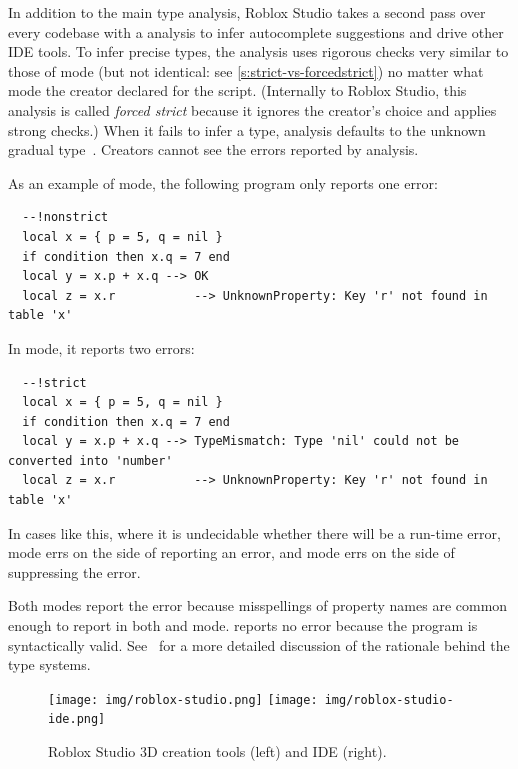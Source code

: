 \documentclass[english,submission,cleveref]{programming}
\begin{document}
In addition to the main type analysis, Roblox Studio takes a second pass over
every codebase with a \emph{\FS{}} analysis to infer autocomplete suggestions
and drive other IDE tools.
To infer precise types,
the \FS{} analysis uses rigorous checks very similar to those of
\mstrict{} mode (but not identical: see \cref{s:strict-vs-forcedstrict})
no matter what mode the creator declared for the script.
(Internally to Roblox Studio, this analysis is called \emph{forced strict}
because it ignores the creator's choice and applies strong checks.)
When it fails to infer a type, \FS{} analysis defaults to the unknown gradual
type~\cite{st-sfp-2006}.
Creators cannot see the errors reported by \FS{} analysis.

As an example of \mnonstrict{} mode, the following program only reports one error:
\begin{verbatim}
  --!nonstrict
  local x = { p = 5, q = nil }
  if condition then x.q = 7 end
  local y = x.p + x.q --> OK
  local z = x.r           --> UnknownProperty: Key 'r' not found in table 'x'
\end{verbatim}
In \mstrict{} mode, it reports two errors:
\begin{verbatim}
  --!strict
  local x = { p = 5, q = nil }
  if condition then x.q = 7 end
  local y = x.p + x.q --> TypeMismatch: Type 'nil' could not be converted into 'number'
  local z = x.r           --> UnknownProperty: Key 'r' not found in table 'x'
\end{verbatim}
In cases like this, where it is undecidable whether there will be a run-time error,
\mstrict{} mode errs on the side of reporting an error, and \mnonstrict{} mode errs on
the side of suppressing the error.

Both modes report the  error because
misspellings of property names are common enough to report in both
\mstrict{} and \mnonstrict{} mode.
\mnocheck{} reports no error because the program is syntactically valid.
See~\cite{bfj-hatra-2021} for a more detailed discussion of the rationale
behind the type systems.

\begin{figure}[t]\centering
  \texttt{[image: img/roblox-studio.png]}
  \hspace{1cm}
  \texttt{[image: img/roblox-studio-ide.png]}
  \caption{{Roblox Studio 3D creation} tools (left) and IDE (right).}
  \label{fig:roblox-studio}
\end{figure}
\end{document}

